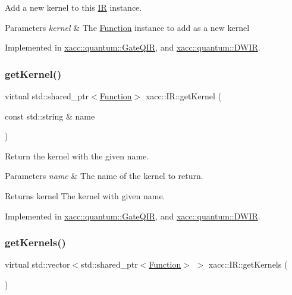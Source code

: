 Add a new kernel to this \hyperlink{a01175}{IR} instance.


\begin{DoxyParams}{Parameters}
{\em kernel} & The \hyperlink{a01151}{Function} instance to add as a new kernel \\
\hline
\end{DoxyParams}


Implemented in \hyperlink{a01027_aa6ed2cf2cbcfec8105c327a4fa95346f}{xacc\+::quantum\+::\+Gate\+Q\+IR}, and \hyperlink{a00979_af1bef18e1e9568d1313b03149aab8c1b}{xacc\+::quantum\+::\+D\+W\+IR}.

\mbox{\label{a01175_a6f49b4ba4b3a15142b04873284885f0d}} 
\subsubsection{\texorpdfstring{get\+Kernel()}{getKernel()}}
{\footnotesize\ttfamily virtual std\+::shared\+\_\+ptr$<$\hyperlink{a01151}{Function}$>$ xacc\+::\+I\+R\+::get\+Kernel (\begin{DoxyParamCaption}\item[{const std\+::string \&}]{name }\end{DoxyParamCaption})\hspace{0.3cm}{\ttfamily [pure virtual]}}

Return the kernel with the given name.


\begin{DoxyParams}{Parameters}
{\em name} & The name of the kernel to return. \\
\hline
\end{DoxyParams}
\begin{DoxyReturn}{Returns}
kernel The kernel with given name. 
\end{DoxyReturn}


Implemented in \hyperlink{a01027_a194758b6edcc3ae0c7fe8004f9bfe690}{xacc\+::quantum\+::\+Gate\+Q\+IR}, and \hyperlink{a00979_a38d8bdd24250749bc38ad31f8512fcfc}{xacc\+::quantum\+::\+D\+W\+IR}.

\mbox{\label{a01175_a88c50bfc5b279145360ddc0c3a703b9b}} 
\subsubsection{\texorpdfstring{get\+Kernels()}{getKernels()}}
{\footnotesize\ttfamily virtual std\+::vector$<$std\+::shared\+\_\+ptr$<$\hyperlink{a01151}{Function}$>$ $>$ xacc\+::\+I\+R\+::get\+Kernels (\begin{DoxyParamCaption}{ }\end{DoxyParamCaption})\hspace{0.3cm}{\ttfamily [pure virtual]}}

